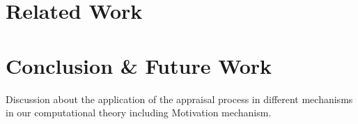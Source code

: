 \documentclass[letterpaper]{article}
\begin{document}
\section{Related Work}

\section{Conclusion \& Future Work}

Discussion about the application of the appraisal process in different
mechanisms in our computational theory including Motivation mechanism. 



\end{document}

